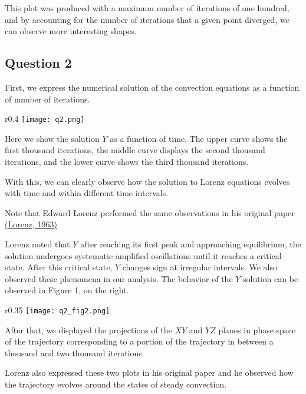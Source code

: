 \documentclass{article}
\begin{document}
This plot was produced with a maximum number of iterations of one hundred, and by accounting for the number of iterations that a given point diverged, we can observe more interesting shapes.

\subsection{Question 2}

First, we express the numerical solution of the convection equations as a function of number of iterations.

\begin{wrapfigure}{r}{0.4\textwidth} %
    \centering
    \texttt{[image: q2.png]}
\end{wrapfigure}

Here we show the solution $Y$ as a function of time. The upper curve shows the first thousand iterations, the middle curve displays the second thousand iterations, and the lower curve shows the third thousand iterations.

With this, we can clearly observe how the solution to Lorenz equations evolves with time and within different time intervals.

Note that Edward Lorenz performed the same observations in his original paper
\href{https://journals.ametsoc.org/view/journals/atsc/20/2/1520-0469_1963_020_0130_dnf_2_0_co_2.xml}{(Lorenz, 1963)}

Lorenz noted that $Y$ after reaching its first peak and approaching equilibrium, the solution undergoes systematic amplified oscillations until it reaches a critical state. After this critical state, $Y$ changes sign at irregular intervals. We also observed these phenomena in our analysis. The behavior of the $Y$ solution can be observed in Figure 1, on the right.

\begin{wrapfigure}{r}{0.35\textwidth} %
    \centering
    \texttt{[image: q2\_fig2.png]}
\end{wrapfigure}

After that, we displayed the projections of the $XY$ and $YZ$ planes in phase space of the trajectory corresponding to a portion of the trajectory in between a thousand and two thousand iterations. 

Lorenz also expressed these two plots in his original paper and he observed how the trajectory evolves around the states of steady convection.
\end{document}
